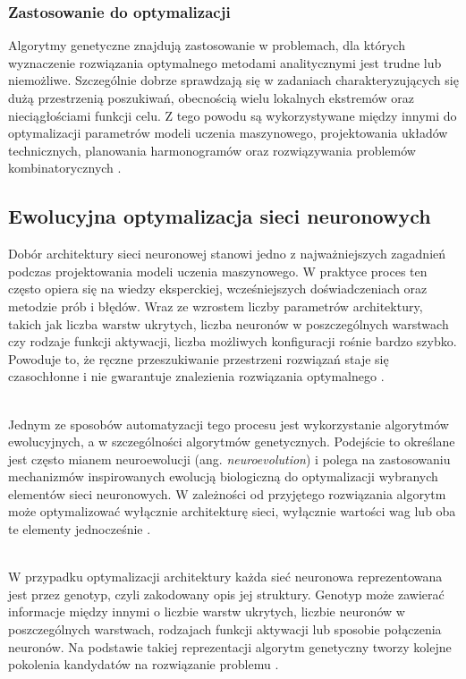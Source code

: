 \subsubsection*{Zastosowanie do optymalizacji}
Algorytmy genetyczne znajdują zastosowanie w problemach,
dla których wyznaczenie rozwiązania optymalnego
metodami analitycznymi jest trudne lub niemożliwe.
Szczególnie dobrze sprawdzają się w zadaniach
charakteryzujących się dużą przestrzenią poszukiwań,
obecnością wielu lokalnych ekstremów
oraz nieciągłościami funkcji celu.
Z tego powodu są wykorzystywane między innymi
do optymalizacji parametrów modeli uczenia maszynowego,
projektowania układów technicznych,
planowania harmonogramów oraz
rozwiązywania problemów kombinatorycznych%
.

\subsection{Ewolucyjna optymalizacja sieci neuronowych}
Dobór architektury sieci neuronowej stanowi
jedno z najważniejszych zagadnień
podczas projektowania modeli uczenia maszynowego.
W praktyce proces ten często opiera się
na wiedzy eksperckiej,
wcześniejszych doświadczeniach
oraz metodzie prób i błędów.
Wraz ze wzrostem liczby parametrów architektury,
takich jak liczba warstw ukrytych,
liczba neuronów w poszczególnych warstwach
czy rodzaje funkcji aktywacji,
liczba możliwych konfiguracji rośnie bardzo szybko.
Powoduje to, że ręczne przeszukiwanie
przestrzeni rozwiązań staje się czasochłonne
i nie gwarantuje znalezienia rozwiązania optymalnego%
%
.

\noindent\\
Jednym ze sposobów automatyzacji tego procesu
jest wykorzystanie algorytmów ewolucyjnych,
a w szczególności algorytmów genetycznych.
Podejście to określane jest często mianem
neuroewolucji (ang. \textit{neuroevolution})
i polega na zastosowaniu mechanizmów
inspirowanych ewolucją biologiczną
do optymalizacji wybranych
elementów sieci neuronowych.
W zależności od przyjętego rozwiązania
algorytm może optymalizować
wyłącznie architekturę sieci,
wyłącznie wartości wag
lub oba te elementy jednocześnie%
%
.

\noindent\\
W przypadku optymalizacji architektury
każda sieć neuronowa reprezentowana jest przez genotyp,
czyli zakodowany opis jej struktury.
Genotyp może zawierać informacje między innymi
o liczbie warstw ukrytych,
liczbie neuronów w poszczególnych warstwach,
rodzajach funkcji aktywacji
lub sposobie połączenia neuronów.
Na podstawie takiej reprezentacji
algorytm genetyczny tworzy
kolejne pokolenia kandydatów
na rozwiązanie problemu%
%
.

